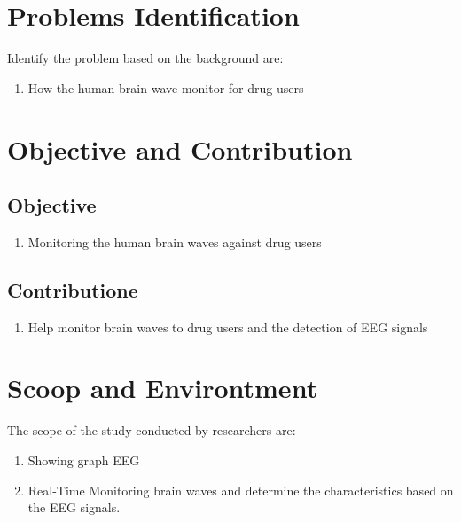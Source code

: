 \section{Problems Identification}
Identify the problem based on the background are:
\begin{enumerate}
    \item How the human brain wave monitor for drug users
\end{enumerate}

\section{Objective and Contribution}
\subsection{Objective}
\begin{enumerate}
    \item Monitoring the human brain waves against drug users
\end{enumerate}
\subsection{Contributione}
\begin{enumerate}
    \item Help monitor brain waves to drug users and the detection of EEG signals
\end{enumerate}
\section{Scoop and Environtment}
The scope of the study conducted by researchers are:
\begin{enumerate}
    \item Showing graph EEG
    \item Real-Time Monitoring brain waves and determine the characteristics based  on the EEG signals. 
\end{enumerate}